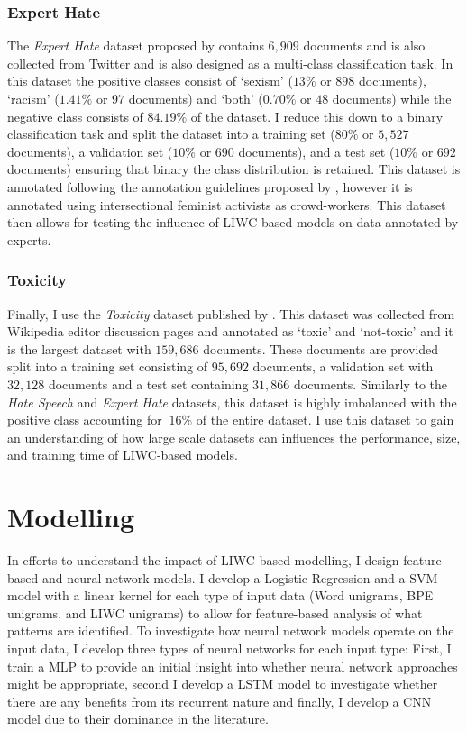 \subsubsection{Expert Hate}
The \textit{Expert Hate} dataset proposed by \citet{Waseem:2016} contains $6,909$ documents and is also collected from Twitter and is also designed as a multi-class classification task. In this dataset the positive classes consist of `sexism' ($13\%$ or $898$ documents), `racism' ($1.41\%$ or $97$ documents) and `both' ($0.70\%$ or $48$ documents) while the negative class consists of $84.19\%$ of the dataset. I reduce this down to a binary classification task and split the dataset into a training set ($80\%$ or $5,527$ documents), a validation set ($10\%$ or $690$ documents), and a test set ($10\%$ or $692$ documents) ensuring that binary the class distribution is retained. This dataset is annotated following the annotation guidelines proposed by \citet{Waseem-Hovy:2016}, however it is annotated using intersectional feminist activists as crowd-workers. This dataset then allows for testing the influence of LIWC-based models on data annotated by experts.

\subsubsection{Toxicity}
Finally, I use the \textit{Toxicity} dataset published by \citet{Wulczyn:2017}. This dataset was collected from Wikipedia editor discussion pages and annotated as `toxic' and `not-toxic' and it is the largest dataset with $159,686$ documents. These documents are provided split into a training set consisting of $95,692$ documents, a validation set with $32,128$ documents and a test set containing $31,866$ documents. Similarly to the \textit{Hate Speech} and \textit{Expert Hate} datasets, this dataset is highly imbalanced with the positive class accounting for $~16\%$ of the entire dataset. I use this dataset to gain an understanding of how large scale datasets can influences the performance, size, and training time of LIWC-based models.

\section{Modelling}\label{sec:liwc_modelling}

In efforts to understand the impact of LIWC-based modelling, I design feature-based and neural network models. I develop a Logistic Regression and a SVM model with a linear kernel for each type of input data (Word unigrams, BPE unigrams, and LIWC unigrams) to allow for feature-based analysis of what patterns are identified. To investigate how neural network models operate on the input data, I develop three types of neural networks for each input type: First, I train a MLP to provide an initial insight into whether neural network approaches might be appropriate, second I develop a LSTM model to investigate whether there are any benefits from its recurrent nature and finally, I develop a CNN model due to their dominance in the literature.\vspace{5mm}

